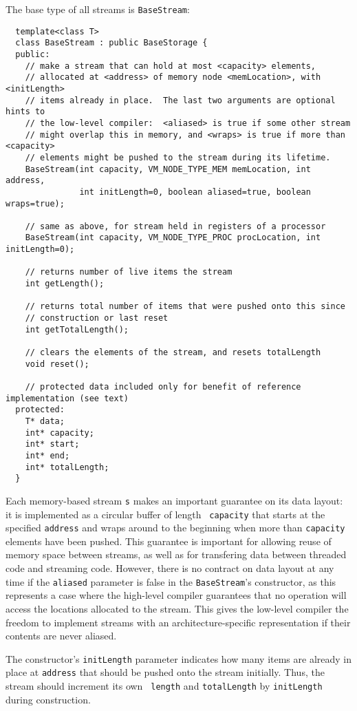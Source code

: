 The base type of all streams is {\tt BaseStream}:
{\small
\begin{verbatim}
  template<class T>
  class BaseStream : public BaseStorage {
  public:
    // make a stream that can hold at most <capacity> elements,
    // allocated at <address> of memory node <memLocation>, with <initLength>
    // items already in place.  The last two arguments are optional hints to
    // the low-level compiler:  <aliased> is true if some other stream 
    // might overlap this in memory, and <wraps> is true if more than <capacity>
    // elements might be pushed to the stream during its lifetime.
    BaseStream(int capacity, VM_NODE_TYPE_MEM memLocation, int address, 
               int initLength=0, boolean aliased=true, boolean wraps=true);

    // same as above, for stream held in registers of a processor
    BaseStream(int capacity, VM_NODE_TYPE_PROC procLocation, int initLength=0);

    // returns number of live items the stream
    int getLength();

    // returns total number of items that were pushed onto this since
    // construction or last reset
    int getTotalLength();

    // clears the elements of the stream, and resets totalLength
    void reset();

    // protected data included only for benefit of reference implementation (see text)
  protected:
    T* data;
    int* capacity;
    int* start;
    int* end;
    int* totalLength;
  }
\end{verbatim}}

Each memory-based stream {\tt s} makes an important guarantee on its
data layout: it is implemented as a circular buffer of length {\tt
capacity} that starts at the specified {\tt address} and wraps around
to the beginning when more than {\tt capacity} elements have been
pushed.  This guarantee is important for allowing reuse of memory
space between streams, as well as for transfering data between
threaded code and streaming code.  However, there is no contract on
data layout at any time if the {\tt aliased} parameter is false in the
{\tt BaseStream}'s constructor, as this represents a case where the
high-level compiler guarantees that no operation will access the
locations allocated to the stream.  This gives the low-level compiler
the freedom to implement streams with an architecture-specific
representation if their contents are never aliased.

The constructor's {\tt initLength} parameter indicates how many items
are already in place at {\tt address} that should be pushed onto the
stream initially. Thus, the stream should increment its own {\tt
length} and {\tt totalLength} by {\tt initLength} during construction.

